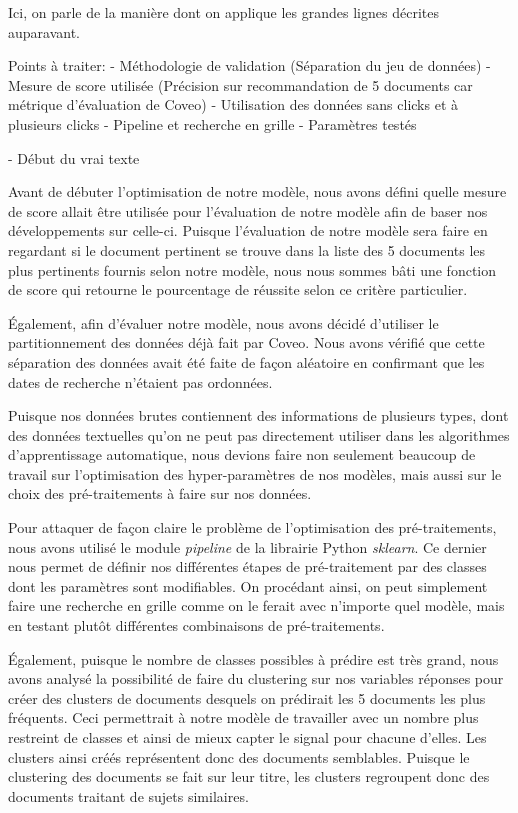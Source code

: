 Ici, on parle de la manière dont on applique les grandes lignes décrites auparavant.

Points à traiter:
	- Méthodologie de validation (Séparation du jeu de données)
	- Mesure de score utilisée (Précision sur recommandation de 5 documents car métrique d'évaluation de Coveo)
	- Utilisation des données sans clicks et à plusieurs clicks
	- Pipeline et recherche en grille
	- Paramètres testés
	
	
- Début du vrai texte



Avant de débuter l'optimisation de notre modèle, nous avons défini quelle mesure de score allait être utilisée pour l'évaluation de notre modèle afin de baser nos développements sur celle-ci.
Puisque l'évaluation de notre modèle sera faire en regardant si le document pertinent se trouve dans la liste des 5 documents les plus pertinents fournis selon notre modèle, nous nous sommes bâti une fonction de score qui retourne le pourcentage de réussite selon ce critère particulier.

Également, afin d'évaluer notre modèle, nous avons décidé d'utiliser le partitionnement des données déjà fait par Coveo. Nous avons vérifié que cette séparation des données avait été faite de façon aléatoire en confirmant que les dates de recherche n'étaient pas ordonnées.

Puisque nos données brutes contiennent des informations de plusieurs types, dont des données textuelles qu'on ne peut pas directement utiliser dans les algorithmes d'apprentissage automatique, nous devions faire non seulement beaucoup de travail sur l'optimisation des hyper-paramètres de nos modèles, mais aussi sur le choix des pré-traitements à faire sur nos données.

Pour attaquer de façon claire le problème de l'optimisation des pré-traitements, nous avons utilisé le module \emph{pipeline} de la librairie Python \emph{sklearn}.
Ce dernier nous permet de définir nos différentes étapes de pré-traitement par des classes dont les paramètres sont modifiables.
On procédant ainsi, on peut simplement faire une recherche en grille comme on le ferait avec n'importe quel modèle, mais en testant plutôt différentes combinaisons de pré-traitements.

Également, puisque le nombre de classes possibles à prédire est très grand, nous avons analysé la possibilité de faire du clustering sur nos variables réponses pour créer des clusters de documents desquels on prédirait les 5 documents les plus fréquents. Ceci permettrait à notre modèle de travailler avec un nombre plus restreint de classes et ainsi de mieux capter le signal pour chacune d'elles.
Les clusters ainsi créés représentent donc des documents semblables.
Puisque le clustering des documents se fait sur leur titre, les clusters regroupent donc des documents traitant de sujets similaires.

